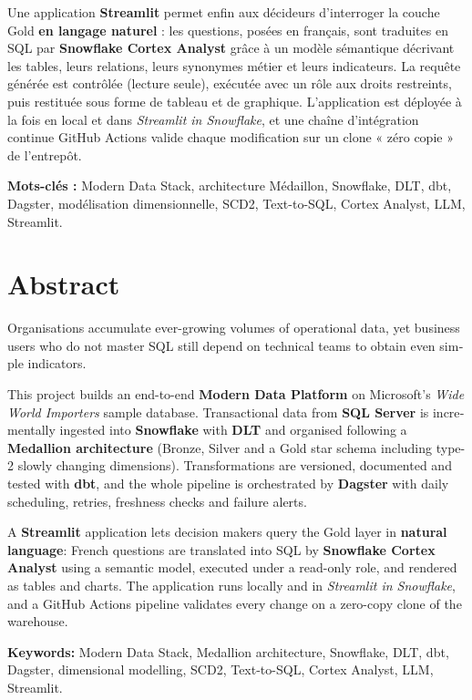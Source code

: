 Une application \textbf{Streamlit} permet enfin aux décideurs d'interroger la couche Gold
\textbf{en langage naturel} : les questions, posées en français, sont traduites en SQL par
\textbf{Snowflake Cortex Analyst} grâce à un modèle sémantique décrivant les tables, leurs relations,
leurs synonymes métier et leurs indicateurs. La requête générée est contrôlée (lecture seule), exécutée
avec un rôle aux droits restreints, puis restituée sous forme de tableau et de graphique. L'application
est déployée à la fois en local et dans \emph{Streamlit in Snowflake}, et une chaîne d'intégration
continue GitHub Actions valide chaque modification sur un clone « zéro copie » de l'entrepôt.

\textbf{Mots-clés :} Modern Data Stack, architecture Médaillon, Snowflake, DLT, dbt, Dagster,
modélisation dimensionnelle, SCD2, Text-to-SQL, Cortex Analyst, LLM, Streamlit.

\chapter*{Abstract}

\begin{otherlanguage}{english}
Organisations accumulate ever-growing volumes of operational data, yet business users who do not master
SQL still depend on technical teams to obtain even simple indicators.

This project builds an end-to-end \textbf{Modern Data Platform} on Microsoft's \emph{Wide World
Importers} sample database. Transactional data from \textbf{SQL Server} is incrementally ingested into
\textbf{Snowflake} with \textbf{DLT} and organised following a \textbf{Medallion architecture}
(Bronze, Silver and a Gold star schema including type-2 slowly changing dimensions). Transformations
are versioned, documented and tested with \textbf{dbt}, and the whole pipeline is orchestrated by
\textbf{Dagster} with daily scheduling, retries, freshness checks and failure alerts.

A \textbf{Streamlit} application lets decision makers query the Gold layer in \textbf{natural
language}: French questions are translated into SQL by \textbf{Snowflake Cortex Analyst} using a
semantic model, executed under a read-only role, and rendered as tables and charts. The application runs
locally and in \emph{Streamlit in Snowflake}, and a GitHub Actions pipeline validates every change on a
zero-copy clone of the warehouse.

\textbf{Keywords:} Modern Data Stack, Medallion architecture, Snowflake, DLT, dbt, Dagster,
dimensional modelling, SCD2, Text-to-SQL, Cortex Analyst, LLM, Streamlit.
\end{otherlanguage}


